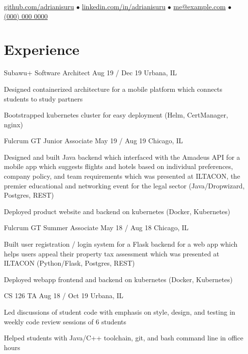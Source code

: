 \documentclass[hidelinks,11pt]{extarticle}
\begin{document}
\flushleft
{\Huge\bfseries{\color{mycolor}{Adrian Herath}}}

{\small
\href{https://github.com/adrianisuru/}{github.com/adrianisuru}
$\bullet$ %
\href{https://www.linkedin.com/in/adrianisuru/}{linkedin.com/in/adrianisuru}
$\bullet$ %
\href{mailto:me@example.com}{me@example.com} %
$\bullet$ %
\href{tel:+1000-000-0000}{(000) 000 0000} %
}

\section{Experience}

\position
{Subawu+}
{Software Architect}
{Aug 19 {\color{mycolor}/} Dec 19}
{Urbana, IL}
{
\item Designed containerized architecture for a mobile platform which connects 
    students to study partners
\item Bootstrapped kubernetes cluster for easy deployment (Helm, CertManager, nginx)
}

\position
{Fulcrum GT}
{Junior Associate}
{May 19 {\color{mycolor}/} Aug 19}
{Chicago, IL}
{
    \item Designed and built Java backend which interfaced with 
            the Amadeus API 
    for a mobile app which suggests
        flights and hotels based on individual preferences, company policy,
        and team requirements 
    which was presented at ILTACON, the premier educational and networking 
        event for the legal sector (Java/Dropwizard, Postgres, REST)
    \item Deployed product website and backend on kubernetes (Docker, Kubernetes)
}

\position
{Fulcrum GT}
{Summer Associate}
{May 18 {\color{mycolor}/} Aug 18}
{Chicago, IL}
{
    \item Built user registration / login system for a Flask backend 
    for a web app which helps users appeal their property tax assessment 
    which was presented at ILTACON (Python/Flask, Postgres, REST)
    \item Deployed webapp frontend and backend on kubernetes (Docker, Kubernetes)
}

\position
{CS 126}
{TA}
{Aug 18 {\color{mycolor}/} Oct 19}
{Urbana, IL}
{
    \item Led discussions of student code with emphasis on style, design, and
        testing in weekly code review sessions of 6 students
    \item Helped students with Java/C++ toolchain, git, and bash command line in
        office hours
}
\end{document}
